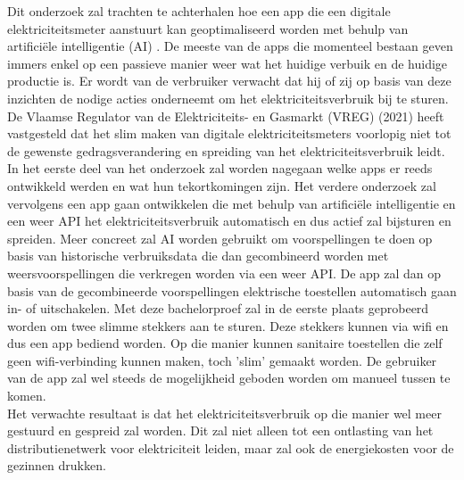Dit onderzoek zal trachten te achterhalen hoe een app die een digitale elektriciteitsmeter aanstuurt kan geoptimaliseerd worden met behulp van artificiële intelligentie (AI) . De meeste van de apps die momenteel bestaan geven immers enkel op een passieve manier weer wat het huidige verbuik en de huidige productie is.  Er wordt van de verbruiker verwacht dat hij of zij op basis van deze inzichten de nodige acties onderneemt om het elektriciteitsverbruik bij te sturen. De Vlaamse Regulator van de Elektriciteits- en Gasmarkt (VREG) (2021) heeft vastgesteld dat het slim maken van digitale elektriciteitsmeters voorlopig niet tot de gewenste gedragsverandering en spreiding van het elektriciteitsverbruik leidt. \\

In het eerste deel van het onderzoek zal worden nagegaan welke apps er reeds ontwikkeld werden en wat hun tekortkomingen zijn. Het verdere onderzoek zal vervolgens een app gaan ontwikkelen die met behulp van artificiële intelligentie en een weer API het elektriciteitsverbruik automatisch en dus actief zal bijsturen en spreiden. Meer concreet zal AI worden gebruikt om voorspellingen te doen op basis van historische verbruiksdata die dan gecombineerd worden met weersvoorspellingen die verkregen worden via een weer API. De app zal dan op basis van de gecombineerde voorspellingen elektrische toestellen automatisch gaan in- of uitschakelen. Met deze bachelorproef zal in de eerste plaats geprobeerd worden om twee slimme stekkers aan te sturen. Deze stekkers kunnen via wifi en dus een app bediend worden. Op die manier kunnen sanitaire toestellen die zelf geen wifi-verbinding kunnen maken, toch 'slim' gemaakt worden. De gebruiker van de app zal wel steeds de mogelijkheid geboden worden om manueel tussen te komen. \\

Het verwachte resultaat is dat het elektriciteitsverbruik op die manier wel meer gestuurd en gespreid zal worden. Dit zal niet alleen tot een ontlasting van het distributienetwerk voor elektriciteit leiden, maar zal ook de energiekosten voor de gezinnen drukken.
